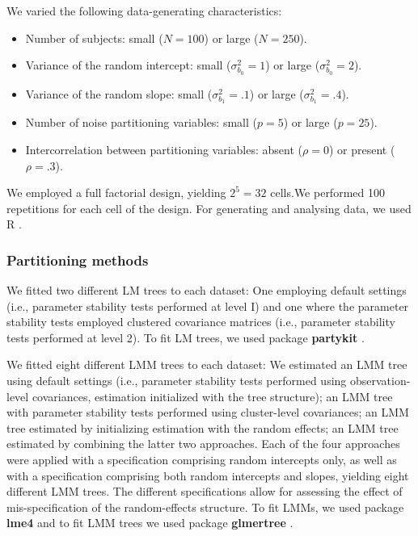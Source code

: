 \documentclass[doc,floatsintext,natbib]{apa7}
\begin{document}
We varied the following data-generating characteristics:

\begin{itemize}
\setlength\itemsep{0em}
\setlength{\itemindent}{0.2in}
\item Number of subjects: small ($N = 100$) or large ($N = 250$).
\item Variance of the random intercept: small ($\sigma_{b_0}^2 = 1$) or large ($\sigma_{b_0}^2 = 2$).
\item Variance of the random slope: small ($\sigma_{b_1}^2 = .1$) or large ($\sigma_{b_1}^2 = .4$).
\item Number of noise partitioning variables: small ($p = 5$) or large ($p = 25$).
\item Intercorrelation between partitioning variables: absent ($\rho = 0$) or present ($\rho = .3$).
\end{itemize}

We employed a full factorial design, yielding $2^5 = 32$ cells.We performed 100 repetitions for each cell of the design. For generating and analysing data, we used R \citep[][version 4.1.2]{R22}. 



\subsubsection{Partitioning methods}

We fitted two different LM trees to each dataset: One employing default settings (i.e., parameter stability tests performed at level I) and one where the parameter stability tests employed clustered covariance matrices (i.e., parameter stability tests performed at level 2). To fit LM trees, we used package \textbf{partykit} \citep[version 1.2-15][]{HothyZeil15}.

We fitted eight different LMM trees to each dataset: We estimated an LMM tree using default settings (i.e., parameter stability tests performed using observation-level covariances, estimation initialized with the tree structure); an LMM tree with parameter stability tests performed using cluster-level covariances; an LMM tree estimated by initializing estimation with the random effects; an LMM tree estimated by combining the latter two approaches. Each of the four approaches were applied with a specification comprising random intercepts only, as well as with a specification comprising both random intercepts and slopes, yielding eight different LMM trees. The different specifications allow for assessing the effect of mis-specification of the random-effects structure. To fit LMMs, we used package \textbf{lme4} \cite[version 1.1-29][]{BateyMach15} and to fit LMM trees we used package \textbf{glmertree} \citep[version 0.2-0][]{FokkySmit18}.
\end{document}
